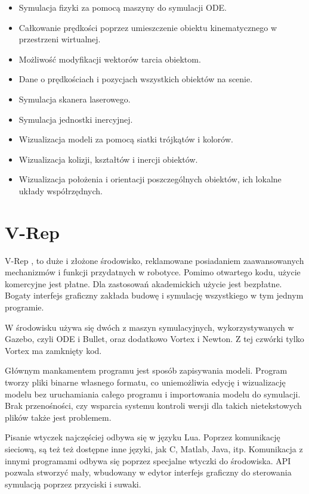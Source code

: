 	\begin{itemize}
		\item Symulacja fizyki za pomocą maszyny do symulacji ODE.
		\item Całkowanie prędkości poprzez umieszczenie obiektu kinematycznego w przestrzeni wirtualnej.
		\item Możliwość modyfikacji wektorów tarcia obiektom.
		\item Dane o prędkościach i pozycjach wszystkich obiektów na scenie.
		\item Symulacja skanera laserowego.
		\item Symulacja jednostki inercyjnej.
		\item Wizualizacja modeli za pomocą siatki trójkątów i kolorów.
		\item Wizualizacja kolizji, kształtów i inercji obiektów.
		\item Wizualizacja położenia i orientacji poszczególnych obiektów, ich lokalne układy współrzędnych.
	\end{itemize}

\section{V-Rep}
	V-Rep \cite{vrep_website}, to duże i złożone środowisko, reklamowane posiadaniem zaawansowanych mechanizmów i funkcji przydatnych w robotyce.
	Pomimo otwartego kodu, użycie komercyjne jest płatne. Dla zastosowań akademickich użycie jest bezpłatne.
	Bogaty interfejs graficzny zakłada budowę i symulację wszystkiego w tym jednym programie.

	W środowisku używa się dwóch z maszyn symulacyjnych, wykorzystywanych w Gazebo, czyli ODE i Bullet, oraz dodatkowo Vortex i Newton. Z tej czwórki tylko Vortex ma zamknięty kod.

	Głównym mankamentem programu jest sposób zapisywania modeli.
	Program tworzy pliki binarne własnego formatu, co uniemożliwia edycję i wizualizację modelu bez uruchamiania całego programu 
	i importowania modelu do symulacji.
	Brak przenośności, czy wsparcia systemu kontroli wersji dla takich nietekstowych plików także jest problemem.

	Pisanie wtyczek najczęściej odbywa się w języku Lua. Poprzez komunikację sieciową, są też też dostępne inne języki, jak C, Matlab, Java, itp.
	Komunikacja z innymi programami odbywa się poprzez specjalne wtyczki do środowiska.
	API pozwala stworzyć mały, wbudowany w edytor interfejs graficzny do sterowania symulacją poprzez przyciski i suwaki.

